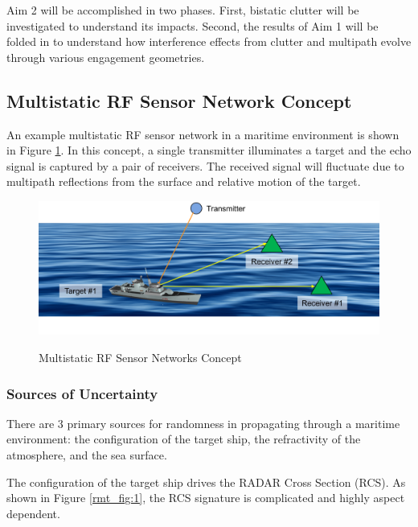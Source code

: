 Aim 2 will be accomplished in two phases. First, bistatic clutter will be investigated to understand its impacts. Second, the results of Aim 1 will be folded in to understand how interference effects from clutter and multipath evolve through various engagement geometries.

\subsection{Multistatic RF Sensor Network Concept}
An example multistatic RF sensor network in a maritime environment is shown in Figure \ref{ms_fig:1}. In this concept, a single transmitter illuminates a target and the echo signal is captured by a pair of receivers. The received signal will fluctuate due to multipath reflections from the surface and relative motion of the target.

\begin{figure}[H]
  \begin{center}
\includegraphics[width=5in]{../media/multistatic/ms_rf_concept.png}
  \end{center}
  \renewcommand{\baselinestretch}{1} \small\normalsize
  \begin{quote}
    \caption[Multistatic RF Sensor Networks Concept]{Multistatic RF Sensor Networks Concept\label{ms_fig:1}}
  \end{quote}
\end{figure}
\renewcommand{\baselinestretch}{2} \small\normalsize

\subsubsection{Sources of Uncertainty}
There are 3 primary sources for randomness in propagating through a maritime environment: the configuration of the target ship, the refractivity of the atmosphere, and the sea surface.

The configuration of the target ship drives the RADAR Cross Section (RCS). As shown in Figure \ref{rmt_fig:1}, the RCS signature is complicated and highly aspect dependent. 

